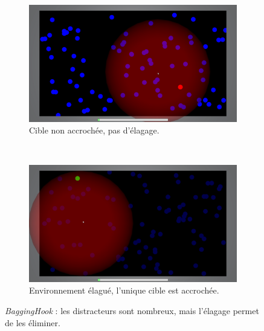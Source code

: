 	\begin{figure}[htb]
		\begin{subfigure}[t]{0.49\textwidth}
			\centering
			\includegraphics[width=\textwidth]{figures/ch5/baggingHook_init}
			\caption{Cible non accrochée, pas d'élagage.}
			\label{fig:baggingHook_init}
		\end{subfigure}
		~
		\begin{subfigure}[t]{0.49\textwidth}
			\centering
			\includegraphics[width=\textwidth]{figures/ch5/baggingHook_culled}
			\caption{Environnement élagué, l'unique cible est accrochée.}
			\label{fig:baggingHook_culled}
		\end{subfigure}
		\caption[Évaluation de \emph{BaggingHook}]{\emph{BaggingHook} : les distracteurs sont nombreux, mais l'élagage permet de les éliminer.}
		\label{fig:baggingHookPix}
	\end{figure}
	
